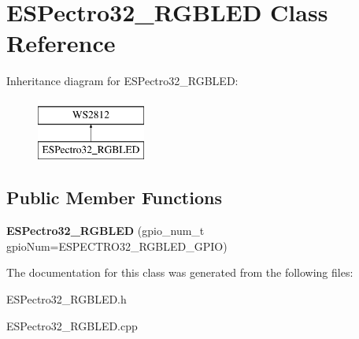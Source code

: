 \hypertarget{classESPectro32__RGBLED}{\section{E\-S\-Pectro32\-\_\-\-R\-G\-B\-L\-E\-D Class Reference}
\label{classESPectro32__RGBLED}
}
Inheritance diagram for E\-S\-Pectro32\-\_\-\-R\-G\-B\-L\-E\-D\-:\begin{figure}[H]
\begin{center}
\leavevmode
\includegraphics[height=2.000000cm]{classESPectro32__RGBLED}
\end{center}
\end{figure}
\subsection*{Public Member Functions}
\begin{DoxyCompactItemize}
\item 
\hypertarget{classESPectro32__RGBLED_a23fa473b601cc8cebd6a117285428c18}{{\bfseries E\-S\-Pectro32\-\_\-\-R\-G\-B\-L\-E\-D} (gpio\-\_\-num\-\_\-t gpio\-Num=E\-S\-P\-E\-C\-T\-R\-O32\-\_\-\-R\-G\-B\-L\-E\-D\-\_\-\-G\-P\-I\-O)}\label{classESPectro32__RGBLED_a23fa473b601cc8cebd6a117285428c18}

\end{DoxyCompactItemize}


The documentation for this class was generated from the following files\-:\begin{DoxyCompactItemize}
\item 
E\-S\-Pectro32\-\_\-\-R\-G\-B\-L\-E\-D.\-h\item 
E\-S\-Pectro32\-\_\-\-R\-G\-B\-L\-E\-D.\-cpp\end{DoxyCompactItemize}
